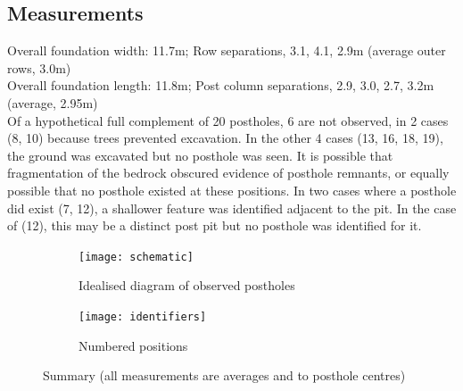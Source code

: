 \documentclass[letterpaper,11pt,titlepage]{article}
\begin{document}
{\subsection{Measurements}
Overall foundation width: 11.7m; Row separations, 3.1, 4.1, 2.9m (average outer rows, 3.0m)\\
Overall foundation length: 11.8m; Post column separations, 2.9, 3.0, 2.7, 3.2m (average, 2.95m)\\

Of a hypothetical full complement of 20 postholes, 6 are not observed, in 2 cases (8, 10) because trees prevented excavation. In the other 4 cases (13, 16, 18, 19), the ground was excavated but no posthole was seen. It is possible that fragmentation of the bedrock obscured evidence of posthole remnants, or equally possible that no posthole existed at these positions. In two cases where a posthole did exist (7, 12), a shallower feature was identified adjacent to the pit. In the case of (12), this may be a distinct post pit but no posthole was identified for it.

\begin{figure}
	\centering
	\begin{subfigure}[b]{0.45\textwidth}
		\texttt{[image: schematic]}
		\caption{Idealised diagram of observed postholes}
		\label{fig:schematic}
	\end{subfigure}
	\begin{subfigure}[b]{0.45\textwidth}
		\texttt{[image: identifiers]}
		\caption{Numbered positions}
		\label{fig:identifiers}
	\end{subfigure}
	\caption{Summary (all measurements are averages and to posthole centres)}\label{fig:measurements}
\end{figure}

}
\end{document}
